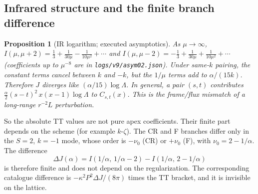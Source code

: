 \documentclass[11pt,a4paper]{article}
\newcommand{\loc}[1]{\nolinkurl{#1}}
\theoremstyle{plain}
\newtheorem{proposition}[theorem]{Proposition}
\theoremstyle{definition}
\theoremstyle{remark}
\numberwithin{equation}{section}
\begin{document}
\subsection{Infrared structure and the finite branch difference}

\begin{proposition}[IR logarithm; executed asymptotics]
\label{prop:v9log}
As \(\mu\to\infty\),
\(I(\mu,\mu+2)=\tfrac13+\tfrac1{30\mu}-\tfrac1{10\mu^2}+\cdots\) and
\(I(\mu,\mu-2)=-\tfrac13+\tfrac1{30\mu}+\tfrac1{10\mu^2}+\cdots\)
(coefficients up to \(\mu^{-8}\) are in \loc{logs/v9/asym02.json}).
Under same-\(k\) pairing, the constant terms cancel between \(k\)
and \(-k\), but the \(1/\mu\) terms add to \(\alpha/(15k)\).
Therefore \(J\) diverges like \((\alpha/15)\log\Lambda\). In
general, a pair \((s,t)\) contributes
\(\tfrac{\alpha}{2}(s-t)^2\,x(x-1)\log\Lambda\) to \(C_{s,t}(x)\).
This is the frame/flux mismatch of a long-range \(r^{-2}L\)
perturbation.
\end{proposition}

So the absolute TT values are not pure apex coefficients. Their
finite part depends on the scheme (for example \(k\)-\(\zeta\)).
The CR and F branches differ only in the \(S=2\), \(k=-1\) mode,
whose order is \(-\nu_0\) (CR) or \(+\nu_0\) (F), with
\(\nu_0=2-1/\alpha\). The difference
\[
 \Delta J(\alpha)=I(1/\alpha,\,1/\alpha-2)-I(1/\alpha,\,2-1/\alpha)
\]
is therefore finite and does not depend on the regularization.
The corresponding catalogue difference is
\(-\kappa^2P^2\Delta J/(8\pi)\) times the TT bracket, and it is
invisible on the lattice.
\end{document}
